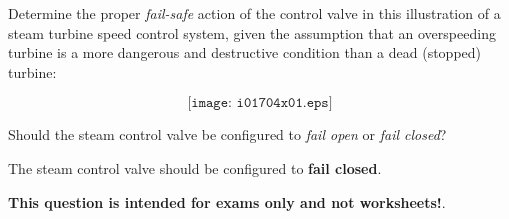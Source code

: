 

Determine the proper {\it fail-safe} action of the control valve in this illustration of a steam turbine speed control system, given the assumption that an overspeeding turbine is a more dangerous and destructive condition than a dead (stopped) turbine:

$$\texttt{[image: i01704x01.eps]}$$

Should the steam control valve be configured to {\it fail open} or {\it fail closed}?







The steam control valve should be configured to {\bf fail closed}.







{\bf This question is intended for exams only and not worksheets!}.



